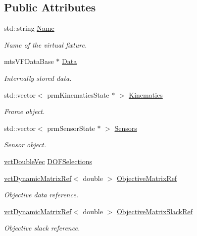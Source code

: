 \subsection*{Public Attributes}
\begin{DoxyCompactItemize}
\item 
std\+::string \hyperlink{classmts_v_f_base_ab8c00c15a86f7df135f985e10983065e}{Name}
\begin{DoxyCompactList}\small\item\em Name of the virtual fixture. \end{DoxyCompactList}\item 
mts\+V\+F\+Data\+Base $\ast$ \hyperlink{classmts_v_f_base_a7ea78be3ece9d1ca77763d4640fa28f0}{Data}
\begin{DoxyCompactList}\small\item\em Internally stored data. \end{DoxyCompactList}\item 
std\+::vector$<$ prm\+Kinematics\+State $\ast$ $>$ \hyperlink{classmts_v_f_base_ad68e05d7529b31405ab7efc74a2dbeaa}{Kinematics}
\begin{DoxyCompactList}\small\item\em Frame object. \end{DoxyCompactList}\item 
std\+::vector$<$ prm\+Sensor\+State $\ast$ $>$ \hyperlink{classmts_v_f_base_aaa45dda5c29d0b4b4b097988fea04ed5}{Sensors}
\begin{DoxyCompactList}\small\item\em Sensor object. \end{DoxyCompactList}\item 
\hyperlink{vct_dynamic_vector_types_8h_ade4b3068c86fb88f41af2e5187e491c2}{vct\+Double\+Vec} \hyperlink{classmts_v_f_base_a5b1e01809d1f9f8486e5c582e651f1e5}{D\+O\+F\+Selections}
\item 
\hyperlink{classvct_dynamic_matrix_ref}{vct\+Dynamic\+Matrix\+Ref}$<$ double $>$ \hyperlink{classmts_v_f_base_ac4da2ed51e5b51a104ad0949457aaadb}{Objective\+Matrix\+Ref}
\begin{DoxyCompactList}\small\item\em Objective data reference. \end{DoxyCompactList}\item 
\hyperlink{classvct_dynamic_matrix_ref}{vct\+Dynamic\+Matrix\+Ref}$<$ double $>$ \hyperlink{classmts_v_f_base_a97679c797cd0099833eab17d255be220}{Objective\+Matrix\+Slack\+Ref}
\begin{DoxyCompactList}\small\item\em Objective slack reference. \end{DoxyCompactList}\item 

\end{DoxyCompactItemize}

